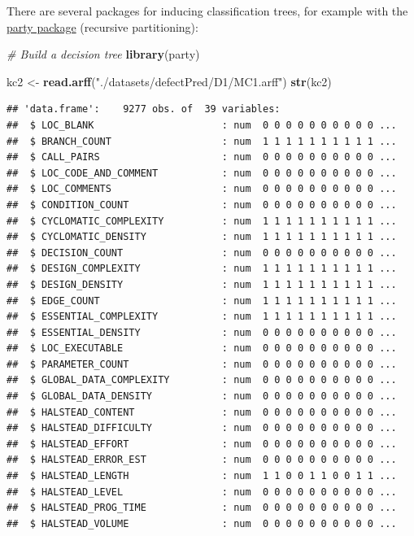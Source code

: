 \documentclass[]{book}
\newenvironment{Shaded}{\begin{snugshade}}{\end{snugshade}}
\newcommand{\KeywordTok}[1]{\textcolor[rgb]{0.13,0.29,0.53}{\textbf{{#1}}}}
\newcommand{\StringTok}[1]{\textcolor[rgb]{0.31,0.60,0.02}{{#1}}}
\newcommand{\CommentTok}[1]{\textcolor[rgb]{0.56,0.35,0.01}{\textit{{#1}}}}
\newcommand{\NormalTok}[1]{{#1}}
\begin{document}
There are several packages for inducing classification trees, for
example with the
\href{https://cran.r-project.org/web/packages/party/index.html}{party
package} (recursive partitioning):

\begin{Shaded}
\begin{Highlighting}[]
\CommentTok{# Build a decision tree}
\KeywordTok{library}\NormalTok{(party)}

\NormalTok{kc2 <-}\StringTok{ }\KeywordTok{read.arff}\NormalTok{(}\StringTok{"./datasets/defectPred/D1/MC1.arff"}\NormalTok{)}
\KeywordTok{str}\NormalTok{(kc2)}
\end{Highlighting}
\end{Shaded}

\begin{verbatim}
## 'data.frame':    9277 obs. of  39 variables:
##  $ LOC_BLANK                      : num  0 0 0 0 0 0 0 0 0 0 ...
##  $ BRANCH_COUNT                   : num  1 1 1 1 1 1 1 1 1 1 ...
##  $ CALL_PAIRS                     : num  0 0 0 0 0 0 0 0 0 0 ...
##  $ LOC_CODE_AND_COMMENT           : num  0 0 0 0 0 0 0 0 0 0 ...
##  $ LOC_COMMENTS                   : num  0 0 0 0 0 0 0 0 0 0 ...
##  $ CONDITION_COUNT                : num  0 0 0 0 0 0 0 0 0 0 ...
##  $ CYCLOMATIC_COMPLEXITY          : num  1 1 1 1 1 1 1 1 1 1 ...
##  $ CYCLOMATIC_DENSITY             : num  1 1 1 1 1 1 1 1 1 1 ...
##  $ DECISION_COUNT                 : num  0 0 0 0 0 0 0 0 0 0 ...
##  $ DESIGN_COMPLEXITY              : num  1 1 1 1 1 1 1 1 1 1 ...
##  $ DESIGN_DENSITY                 : num  1 1 1 1 1 1 1 1 1 1 ...
##  $ EDGE_COUNT                     : num  1 1 1 1 1 1 1 1 1 1 ...
##  $ ESSENTIAL_COMPLEXITY           : num  1 1 1 1 1 1 1 1 1 1 ...
##  $ ESSENTIAL_DENSITY              : num  0 0 0 0 0 0 0 0 0 0 ...
##  $ LOC_EXECUTABLE                 : num  0 0 0 0 0 0 0 0 0 0 ...
##  $ PARAMETER_COUNT                : num  0 0 0 0 0 0 0 0 0 0 ...
##  $ GLOBAL_DATA_COMPLEXITY         : num  0 0 0 0 0 0 0 0 0 0 ...
##  $ GLOBAL_DATA_DENSITY            : num  0 0 0 0 0 0 0 0 0 0 ...
##  $ HALSTEAD_CONTENT               : num  0 0 0 0 0 0 0 0 0 0 ...
##  $ HALSTEAD_DIFFICULTY            : num  0 0 0 0 0 0 0 0 0 0 ...
##  $ HALSTEAD_EFFORT                : num  0 0 0 0 0 0 0 0 0 0 ...
##  $ HALSTEAD_ERROR_EST             : num  0 0 0 0 0 0 0 0 0 0 ...
##  $ HALSTEAD_LENGTH                : num  1 1 0 0 1 1 0 0 1 1 ...
##  $ HALSTEAD_LEVEL                 : num  0 0 0 0 0 0 0 0 0 0 ...
##  $ HALSTEAD_PROG_TIME             : num  0 0 0 0 0 0 0 0 0 0 ...
##  $ HALSTEAD_VOLUME                : num  0 0 0 0 0 0 0 0 0 0 ...

\end{verbatim}
\end{document}
